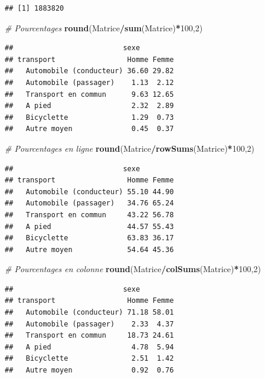 \documentclass[
  11pt,
  french,
]{book}
\makeatletter
\newenvironment{Shaded}{\begin{snugshade}}{\end{snugshade}}
\newcommand{\CommentTok}[1]{\textcolor[rgb]{0.56,0.35,0.01}{\textit{#1}}}
\newcommand{\DecValTok}[1]{\textcolor[rgb]{0.00,0.00,0.81}{#1}}
\newcommand{\KeywordTok}[1]{\textcolor[rgb]{0.13,0.29,0.53}{\textbf{#1}}}
\newcommand{\NormalTok}[1]{#1}
\newcommand{\OperatorTok}[1]{\textcolor[rgb]{0.81,0.36,0.00}{\textbf{#1}}}
\newenvironment{kframe}{%
\medskip{}
\setlength{\fboxsep}{.8em}
 \def\at@end@of@kframe{}%
 \ifinner\ifhmode%
  \def\at@end@of@kframe{\end{minipage}}%
  \begin{minipage}{\columnwidth}%
 \fi\fi%
 \def\FrameCommand##1{\hskip\@totalleftmargin \hskip-\fboxsep
 \colorbox{shadecolor}{##1}\hskip-\fboxsep
     \hskip-\linewidth \hskip-\@totalleftmargin \hskip\columnwidth}%
 \MakeFramed {\advance\hsize-\width
   \@totalleftmargin\z@ \linewidth\hsize
   \@setminipage}}%
 {\par\unskip\endMakeFramed%
 \at@end@of@kframe}
\renewenvironment{Shaded}{\begin{kframe}}{\end{kframe}}
\makeatother
\begin{document}
\begin{verbatim}
## [1] 1883820
\end{verbatim}

\begin{Shaded}
\begin{Highlighting}[]
\CommentTok{# Pourcentages}
\KeywordTok{round}\NormalTok{(Matrice}\OperatorTok{/}\KeywordTok{sum}\NormalTok{(Matrice)}\OperatorTok{*}\DecValTok{100}\NormalTok{,}\DecValTok{2}\NormalTok{)}
\end{Highlighting}
\end{Shaded}

\begin{verbatim}
##                          sexe
## transport                 Homme Femme
##   Automobile (conducteur) 36.60 29.82
##   Automobile (passager)    1.13  2.12
##   Transport en commun      9.63 12.65
##   A pied                   2.32  2.89
##   Bicyclette               1.29  0.73
##   Autre moyen              0.45  0.37
\end{verbatim}

\begin{Shaded}
\begin{Highlighting}[]
\CommentTok{# Pourcentages en ligne}
\KeywordTok{round}\NormalTok{(Matrice}\OperatorTok{/}\KeywordTok{rowSums}\NormalTok{(Matrice)}\OperatorTok{*}\DecValTok{100}\NormalTok{,}\DecValTok{2}\NormalTok{)}
\end{Highlighting}
\end{Shaded}

\begin{verbatim}
##                          sexe
## transport                 Homme Femme
##   Automobile (conducteur) 55.10 44.90
##   Automobile (passager)   34.76 65.24
##   Transport en commun     43.22 56.78
##   A pied                  44.57 55.43
##   Bicyclette              63.83 36.17
##   Autre moyen             54.64 45.36
\end{verbatim}

\begin{Shaded}
\begin{Highlighting}[]
\CommentTok{# Pourcentages en colonne}
\KeywordTok{round}\NormalTok{(Matrice}\OperatorTok{/}\KeywordTok{colSums}\NormalTok{(Matrice)}\OperatorTok{*}\DecValTok{100}\NormalTok{,}\DecValTok{2}\NormalTok{)}
\end{Highlighting}
\end{Shaded}

\begin{verbatim}
##                          sexe
## transport                 Homme Femme
##   Automobile (conducteur) 71.18 58.01
##   Automobile (passager)    2.33  4.37
##   Transport en commun     18.73 24.61
##   A pied                   4.78  5.94
##   Bicyclette               2.51  1.42
##   Autre moyen              0.92  0.76
\end{verbatim}
\end{document}
